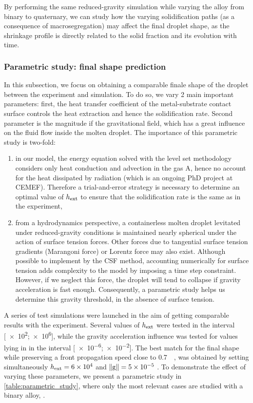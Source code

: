 By performing the same reduced-gravity simulation while varying the alloy from binary to quaternary, we can study 
how the varying solidification paths (as a consequence of macrosegregation) may affect the final droplet shape, 
as the shrinkage profile is directly related to the solid fraction and its evolution with time.

\subsubsection{Parametric study: final shape prediction}

In this subsection, we focus on obtaining a comparable finale shape of the droplet between the experiment and simulation.
To do so, we vary 2 main important parameters: first, the heat transfer coefficient of the metal-substrate contact surface
controls the heat extraction and hence the solidification rate. Second parameter is the magnitude if the gravitational field,
which has a great influence on the fluid flow inside the molten droplet.
The importance of this parametric study is two-fold: 
\begin{enumerate}
\itemsep0em

\item in our model, the energy equation solved with the level set methodology considers only heat conduction 
and advection in the gas A, hence no account for the heat dissipated by radiation (which is an ongoing PhD project at CEMEF). 
Therefore a trial-and-error strategy is necessary to determine an optimal value of $h_{\text{ext}}$ to ensure that the solidification rate is the same
as in the experiment,

\item from a hydrodynamics perspective, a containerless molten droplet levitated under reduced-gravity conditions is maintained nearly spherical 
under the action of surface tension forces. Other forces due to tangential surface tension gradients (Marangoni force) or Lorentz force may also exist.
Although possible to implement by the CSF method, accounting numerically for surface tension adds complexity to the model by imposing
a time step constraint. However, if we neglect this force, the droplet will tend to collapse if gravity acceleration is fast enough.
Consequently, a parametric study helps us determine this gravity threshold, in the absence of surface tension. 
\end{enumerate}

A series of test simulations were launched in the aim of getting comparable results with the experiment.
Several values of $h_{\text{ext}}$ were tested in the interval [\num{e2};\num{e6}], while the gravity acceleration influence was tested
for values lying in in the interval [\num{e-6};\num{e-2}]. The best match for the final shape while preserving a front propagation
speed close to \SI{0.7}{\milli \uvelocity}, was obtained by setting simultaneously $h_{\text{ext}}=6 \times 10^{4}$ \si{\uhconvec} and $\lVert \boldsymbol{\text{g}} \rVert=5\times 10^{-5}$ \si{\uacceleration}.
To demonstrate the effect of varying these parameters, we present a parametric study in \cref{table:parametric_study}, where only the most relevant cases are studied with
a binary alloy, .

